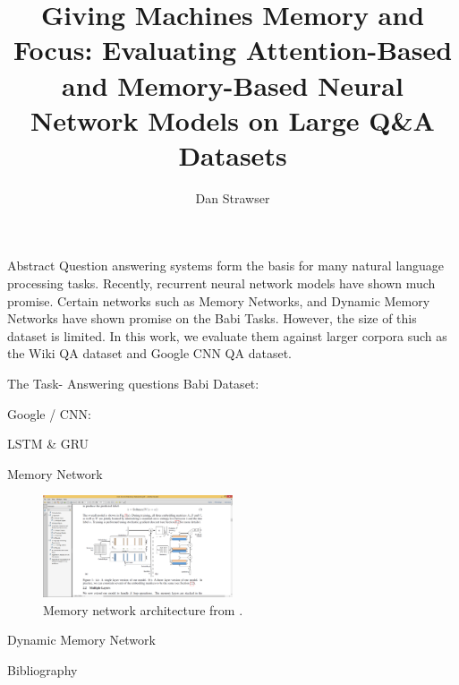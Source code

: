 \documentclass{beamer}
\title[Crisis]{Giving Machines Memory and Focus: Evaluating Attention-Based and Memory-Based Neural Network Models on Large Q\&A Datasets}
\author{Dan Strawser}
\begin{document}
\frame{\titlepage}

\begin{frame}{Abstract}
Question answering systems form the basis for many natural language processing tasks.  Recently, recurrent neural network models have shown much promise.  Certain networks such as Memory Networks, and Dynamic Memory Networks have shown promise on the Babi Tasks. However, the size of this dataset is limited.  In this work, we evaluate them against larger corpora such as the Wiki QA dataset and Google CNN QA dataset.  
\end{frame}

\begin{frame}{The Task- Answering questions}
Babi Dataset:
\vspace{.1 cm}
 \par

Google / CNN:

\end{frame}

\begin{frame}{LSTM \& GRU}


\end{frame}



\begin{frame}{Memory Network}
\begin{figure}[!ht]
  \caption{Memory network architecture from .}
  \centering
    \includegraphics[width=0.5\textwidth]{images/MemoryNetwork}
\end{figure}
\end{frame}


\begin{frame}{Dynamic Memory Network}




\end{frame}




\begin{frame}{Bibliography}

\nocite{*}



\end{frame}
\end{document}
